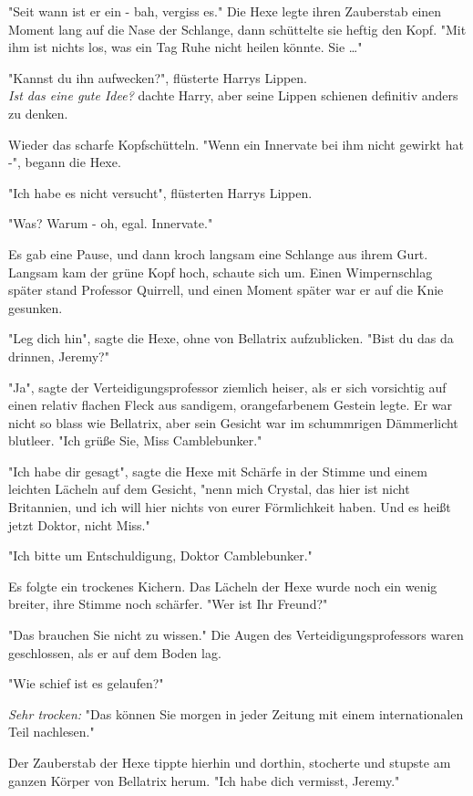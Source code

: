 {"Seit wann ist er ein - bah, vergiss es." Die Hexe legte ihren Zauberstab einen Moment lang auf die Nase der Schlange, dann schüttelte sie heftig den Kopf. "Mit ihm ist nichts los, was ein Tag Ruhe nicht heilen könnte. Sie …"

"Kannst du ihn aufwecken?", flüsterte Harrys Lippen.\\ \emph{Ist das eine gute Idee?} dachte Harry, aber seine Lippen schienen definitiv anders zu denken.

Wieder das scharfe Kopfschütteln. "Wenn ein Innervate bei ihm nicht gewirkt hat -", begann die Hexe.

"Ich habe es nicht versucht", flüsterten Harrys Lippen.

"Was? Warum - oh, egal. Innervate."

Es gab eine Pause, und dann kroch langsam eine Schlange aus ihrem Gurt. Langsam kam der grüne Kopf hoch, schaute sich um. Einen Wimpernschlag später stand Professor Quirrell, und einen Moment später war er auf die Knie gesunken.

"Leg dich hin", sagte die Hexe, ohne von Bellatrix aufzublicken. "Bist du das da drinnen, Jeremy?"

"Ja", sagte der Verteidigungsprofessor ziemlich heiser, als er sich vorsichtig auf einen relativ flachen Fleck aus sandigem, orangefarbenem Gestein legte. Er war nicht so blass wie Bellatrix, aber sein Gesicht war im schummrigen Dämmerlicht blutleer. "Ich grüße Sie, Miss Camblebunker."

"Ich habe dir gesagt", sagte die Hexe mit Schärfe in der Stimme und einem leichten Lächeln auf dem Gesicht, "nenn mich Crystal, das hier ist nicht Britannien, und ich will hier nichts von eurer Förmlichkeit haben. Und es heißt jetzt Doktor, nicht Miss."

"Ich bitte um Entschuldigung, Doktor Camblebunker."

Es folgte ein trockenes Kichern. Das Lächeln der Hexe wurde noch ein wenig breiter, ihre Stimme noch schärfer. "Wer ist Ihr Freund?"

"Das brauchen Sie nicht zu wissen." Die Augen des Verteidigungsprofessors waren geschlossen, als er auf dem Boden lag.

"Wie schief ist es gelaufen?"

\emph{Sehr trocken:} "Das können Sie morgen in jeder Zeitung mit einem internationalen Teil nachlesen."

Der Zauberstab der Hexe tippte hierhin und dorthin, stocherte und stupste am ganzen Körper von Bellatrix herum. "Ich habe dich vermisst, Jeremy."

}
